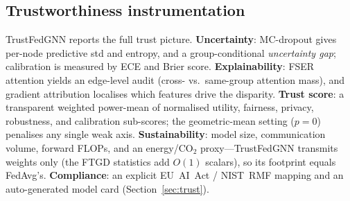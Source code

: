 \subsection{Trustworthiness instrumentation}
\label{sec:method-trust}
TrustFedGNN reports the full trust picture. \textbf{Uncertainty}: MC-dropout gives
per-node predictive std and entropy, and a group-conditional \emph{uncertainty
gap}; calibration is measured by ECE and Brier score.
\textbf{Explainability}: FSER attention yields an edge-level audit (cross- vs.\
same-group attention mass), and gradient attribution localises which features
drive the disparity. \textbf{Trust score}: a transparent weighted power-mean of
normalised utility, fairness, privacy, robustness, and calibration sub-scores;
the geometric-mean setting ($p{=}0$) penalises any single weak axis.
\textbf{Sustainability}: model size, communication volume, forward FLOPs, and an
energy/CO$_2$ proxy---TrustFedGNN transmits weights only (the FTGD statistics add
$O(1)$ scalars), so its footprint equals FedAvg's. \textbf{Compliance}: an
explicit EU~AI~Act / NIST~RMF mapping and an auto-generated model card
(Section~\ref{sec:trust}).
